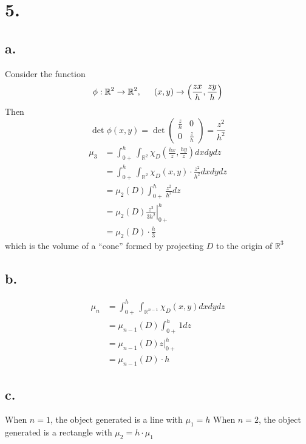 \documentclass[11pt]{article}
\begin{document}
\section*{5.}
\subsection*{a.}
Consider the function 
\[
    \phi: \mathbb{R}^2 \to \mathbb{R}^2, \indent (x,y) \to \left(\frac{zx}{h}, \frac{zy}{h} \right)    
\]
Then 
\[
    \det \phi(x,y) =
    \det 
    \begin{pmatrix}
        \frac{z}{h} & 0 \\
        0 & \frac{z}{h}
    \end{pmatrix}
    = \frac{z^2}{h^2}  
\]
\begin{equation*}
    \begin{aligned}
        \mu_3 
        &= \int_{0+}^h \int_{\mathbb{R}^2} \chi_D  \left(\frac{hx}{z}, \frac{hy}{z} \right) dxdydz \\
        &= \int_{0+}^h \int_{\mathbb{R}^2} \chi_D (x,y) \cdot \frac{z^2}{h^2} dxdydz \\
        &= \mu_2(D) \int_{0+}^h \frac{z^2}{h^2} dz \\
        &= \mu_2(D) \left.\frac{z^3}{3h^2} \right|_{0+}^{h} \\
        &= \mu_2(D) \cdot \frac{h}{3}
    \end{aligned}
\end{equation*}
which is the volume of a “cone” formed by projecting $D$ to the origin of $\mathbb{R}^3$
\subsection*{b.}
\begin{equation*}
    \begin{aligned}
        \mu_n 
        &= \int_{0+}^h \int_{\mathbb{R}^{n-1}} \chi_D  \left(x, y \right) dxdydz \\
        &= \mu_{n-1}(D) \int_{0+}^h 1 dz \\
        &= \mu_{n-1}(D) \left.z \right|_{0+}^{h} \\
        &= \mu_{n-1}(D) \cdot h
    \end{aligned}
\end{equation*}
\subsection*{c.}
When $n=1$, the object generated is a line with $\mu_1 = h$
When $n=2$, the object generated is a rectangle with $\mu_2 = h \cdot \mu_1$
\pagebreak
\end{document}
